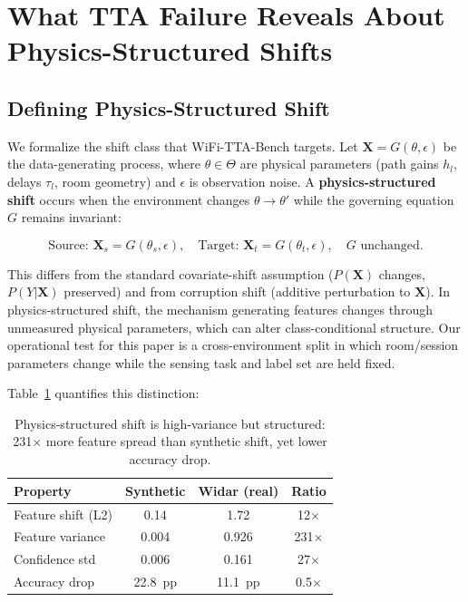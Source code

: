 \section{What TTA Failure Reveals About Physics-Structured Shifts}
\label{sec:rootcause}

\subsection{Defining Physics-Structured Shift}

We formalize the shift class that WiFi-TTA-Bench targets. Let $\mathbf{X} = G(\theta, \epsilon)$ be the data-generating process, where $\theta \in \Theta$ are physical parameters (path gains $h_l$, delays $\tau_l$, room geometry) and $\epsilon$ is observation noise. A \textbf{physics-structured shift} occurs when the environment changes $\theta \to \theta'$ while the governing equation $G$ remains invariant:

\begin{equation}
    \text{Source: } \mathbf{X}_s = G(\theta_s, \epsilon), \quad \text{Target: } \mathbf{X}_t = G(\theta_t, \epsilon), \quad G \text{ unchanged.}
\end{equation}

This differs from the standard covariate-shift assumption ($P(\mathbf{X})$ changes, $P(Y|\mathbf{X})$ preserved) and from corruption shift (additive perturbation to $\mathbf{X}$). In physics-structured shift, the mechanism generating features changes through unmeasured physical parameters, which can alter class-conditional structure. Our operational test for this paper is a cross-environment split in which room/session parameters change while the sensing task and label set are held fixed.

Table~\ref{tab:shift_props} quantifies this distinction:

\begin{table}[h]
\centering
\caption{Physics-structured shift is high-variance but structured: 231$\times$ more feature spread than synthetic shift, yet lower accuracy drop.}
\label{tab:shift_props}
\small
\begin{tabular}{lccc}
\toprule
\textbf{Property} & \textbf{Synthetic} & \textbf{Widar (real)} & \textbf{Ratio} \\
\midrule
Feature shift (L2) & 0.14 & 1.72 & 12$\times$ \\
Feature variance & 0.004 & 0.926 & 231$\times$ \\
Confidence std & 0.006 & 0.161 & 27$\times$ \\
Accuracy drop & 22.8~pp & 11.1~pp & 0.5$\times$ \\
\bottomrule
\end{tabular}
\end{table}

